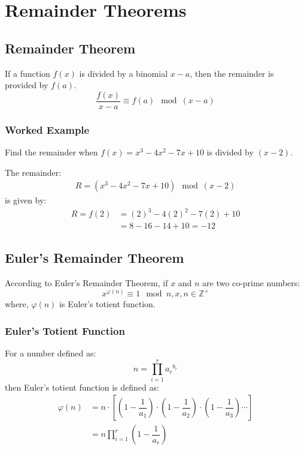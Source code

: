\large{\chapter{Remainder Theorems}}

\section{Remainder Theorem}
If a function $f(x)$ is divided by a binomial $x-a$, then the remainder is provided by $f(a)$.
\begin{equation}
	\dfrac{f(x)}{x-a} \equiv f(a) \mod \left(x-a\right)
\end{equation}

\subsection*{Worked Example}
Find the remainder when $f(x) = x^3 - 4 x^2 - 7 x + 10$ is divided by $(x-2)$.\par
The remainder:
\begin{align*}
	R = \left(x^3 - 4 x^2 - 7 x + 10\right)\mod\left(x-2\right)
\end{align*}
is given by:
\begin{align*}
	R = f(2) & = (2)^3 - 4 (2)^2 - 7(2) + 10\\ & = 8 - 16 - 14 + 10 = -12
\end{align*}

\section{Euler's Remainder Theorem}
According to Euler's Remainder Theorem, if $x$ and $n$ are two co-prime numbers:
\begin{equation}
	x^{\varphi (n)} \equiv 1 \mod n, x,n \in \mathbb{Z}^+
\end{equation}
where, $\varphi(n)$ is Euler's totient function.

\subsection{Euler's Totient Function}
For a number defined as:
\begin{equation}
	n=\prod_{i=1}^r {a_r}^{b_r}
\end{equation}
then Euler's totient function is defined as:
\begin{align}
	\varphi(n) & = n \cdot \left[\left( 1 - \dfrac{1}{a_1} \right) \cdot \left( 1 - \dfrac{1}{a_2} \right) \cdot \left( 1 - \dfrac{1}{a_3} \right) \cdots \right] \nonumber \\
	& = n \prod_{i=1}^r \left(1 - \dfrac{1}{a_r} \right)
\end{align}
